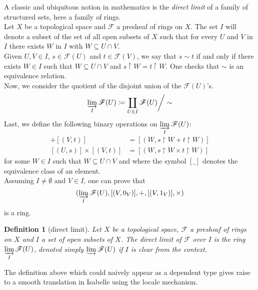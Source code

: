 \documentclass[12pt]{scrartcl}
\newtheorem{definition}[proposition]{Definition}
\begin{document}
A classic and ubiquitous notion in mathematics is the \emph{direct limit} of a family of structured sets, here a family of rings. \\
Let $X$ be a topological space and $\mathscr{F}$ a presheaf of rings on $X$. The set $I$ will denote a subset of the set of all open subsets of $X$ such that for every $U$ and $V$ in $I$ there exists $W$ in $I$ with $W \subseteq U \cap V$. \\
Given $U, V \in I$, $s \in \mathscr{F}(U)$ and $t \in \mathscr{F}(V)$,  we say that 
$s \sim t$ if and only if there exists $W \in I$ such that $W \subseteq U \cap V$ and $s \restriction W = t \restriction W$. One checks that $\sim$ is an equivalence relation. \\
Now, we consider the quotient of the disjoint union of the $\mathscr{F}(U)$'s.
	\[
	\varinjlim_I \mathscr{F}(U) \coloneqq \coprod_{U \in I} \mathscr{F}(U) \bigg/ \sim 
	\]
Last, we define the following binary operations on $\displaystyle \varinjlim_{I} \mathscr{F}(U)$:
	\begin{align*}
	[(U, s)] + [(V, t)] & = [(W, s \restriction W + t \restriction W)] \\
	[(U, s)] \times [(V, t)] & = [(W, s \restriction W \times t \restriction W)]
	\end{align*}
for some $W \in I$ such that $W \subseteq U \cap V$ and where the symbol $[\_]$ denotes the equivalence class of an element. \\
Assuming $I \neq \emptyset$ and $V \in I$, one can prove that  
	\[
	(\varinjlim_I \mathscr{F}(U), [(V, 0_V)], +, [(V, 1_V)], \times)
	\]
is a ring. 

\begin{definition}[direct limit]
	Let $X$ be a topological space, $\mathscr{F}$ a presheaf of rings on $X$ and $I$ a set of open subsets of $X$. The direct limit of $\mathscr{F}$ over $I$ is the ring $\displaystyle \varinjlim_I \mathscr{F}(U)$, denoted simply $\varinjlim \mathscr{F}(U)$ if $I$ is clear from the context.
\end{definition}

The definition above which could naively appear as a dependent type gives raise to a smooth translation in Isabelle using the locale mechanism.

\end{document}
